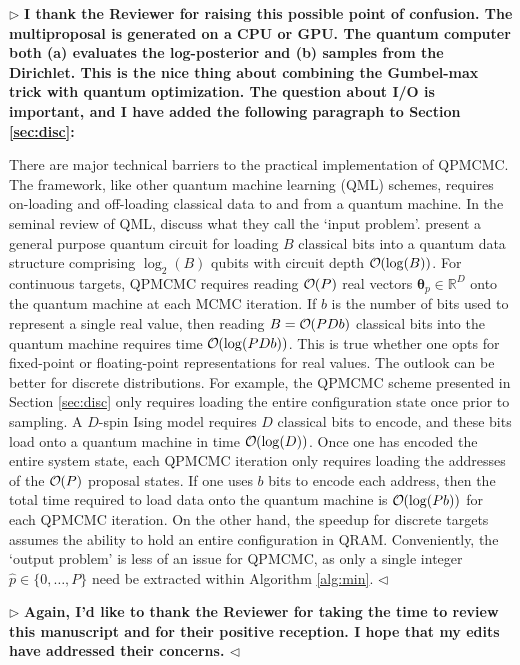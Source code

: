 \documentclass[12pt]{article}
\newenvironment{reply}{$\triangleright$\bfseries}{$\triangleleft$}
\renewenvironment{quote}
               {\list{}{\rightmargin\leftmargin}%
                \item\relax\normalfont}
               {\endlist}
\newcommand{\order}[1]{{\cal O}\hspace{-0.2em}\left( #1 \right)}
\newcommand{\ttheta}{\boldsymbol{\theta}}
\begin{document}
\begin{reply}
	I thank the Reviewer for raising this possible point of confusion.  The multiproposal is generated on a CPU or GPU.  The quantum computer both (a) evaluates the log-posterior and (b) samples from the Dirichlet.  This is the nice thing about combining the Gumbel-max trick with quantum optimization.  The question about I/O is important, and I have added the following paragraph to Section \ref{sec:disc}:
	\begin{quote}
There are major technical barriers to the practical implementation of QPMCMC.  The framework, like other quantum machine learning (QML) schemes, requires on-loading and off-loading classical data to and from a quantum machine.  In the seminal review of QML, \citet{biamonte2017quantum} discuss what they call the `input problem'.  \citet{cortese2018loading} present a general purpose quantum circuit for loading $B$ classical bits into a quantum data structure comprising $\log_2 (B)$ qubits with circuit depth $\order{\log (B)}$.  For continuous targets, QPMCMC requires reading $\order{P}$ real vectors $\ttheta_p\in \mathbb{R}^D$ onto the quantum machine at each MCMC iteration.  If $b$ is the number of bits used to represent a single real value, then reading $B=\order{PDb}$ classical bits into the quantum machine requires time $\order{\log (PDb)}$.  This is true whether one opts for fixed-point \citep{jordan2005fast} or floating-point \citep{haener2018quantum} representations for real values.  The outlook can be better for discrete distributions.  For example, the QPMCMC scheme presented in Section \ref{sec:disc} only requires loading the entire configuration state once prior to sampling.  A $D$-spin Ising model requires $D$ classical bits to encode, and these bits load onto a quantum machine in time $\order{\log(D)}$.  Once one has encoded the entire system state, each QPMCMC iteration only requires loading the addresses of the $\order{P}$ proposal states. If one uses $b$ bits to encode each address, then the total time required to load data onto the quantum machine is $\order{\log(Pb)}$ for each QPMCMC iteration.  On the other hand, the speedup for discrete targets assumes the ability to hold an entire configuration in QRAM.
Conveniently, the `output problem' is less of an issue for QPMCMC, as only a single integer $\hat{p} \in \{0,\dots,P\}$ need be extracted within Algorithm \ref{alg:min}.
	\end{quote}
\end{reply}


\begin{reply}
	Again, I'd like to thank the Reviewer for taking the time to review this manuscript and for their positive reception.  I hope that my edits have addressed their concerns.
\end{reply}
\end{document}
